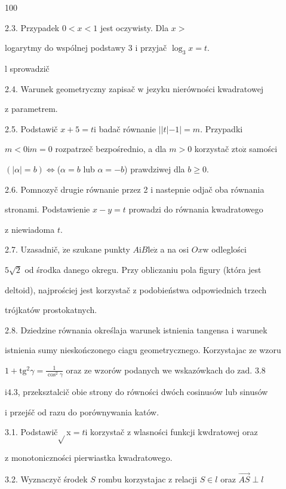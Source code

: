 \documentclass[a4paper,12pt]{article}
\begin{document}
100

2.3. Przypadek $0 < x < 1$ jest oczywisty. Dla $x >$

logarytmy do wspólnej podstawy 3 $\mathrm{i}$ przyjač $\log_{3}x=t.$

l sprowadzič

2.4. Warunek geometryczny zapisač $\mathrm{w}$ jezyku nierówności kwadratowej

$\mathrm{z}$ parametrem.

2.5. Podstawič $x+5 =t\mathrm{i}$ badač równanie $||t|-1| =m$. Przypadki

$m<0\mathrm{i}m=0$ rozpatrzeč bezpośrednio, a dla $m>0$ korzystač $\mathrm{z}\mathrm{t}\mathrm{o}\dot{\mathrm{z}}$ samości

$(|\alpha|=b)\Leftrightarrow$($\alpha=b$ lub $\alpha=-b$) prawdziwej dla $b\geq 0.$

2.6. Pomnozyč drugie równanie przez 2 $\mathrm{i}$ nastepnie odjač oba równania

stronami. Podstawienie $x-y = t$ prowadzi do równania kwadratowego

$\mathrm{z}$ niewiadoma $t.$

2.7. Uzasadnič, $\dot{\mathrm{z}}\mathrm{e}$ szukane punkty $A\mathrm{i}B\mathrm{l}\mathrm{e}\dot{\mathrm{z}}$ a na osi $Ox\mathrm{w}$ odleglości

$5\sqrt{2}$ od środka danego okregu. Przy obliczaniu pola figury (która jest

deltoid), najprościej jest korzystač $\mathrm{z}$ podobieństwa odpowiednich trzech

trójkatów prostokatnych.

2.8. Dziedzine równania określaja warunek istnienia tangensa $\mathrm{i}$ warunek

istnienia sumy nieskończonego ciagu geometrycznego. Korzystajac ze wzoru

$1+\mathrm{t}\mathrm{g}^{2}\gamma= \displaystyle \frac{1}{\cos^{2}\gamma}$ oraz ze wzorów podanych we wskazówkach do $\mathrm{z}\mathrm{a}\mathrm{d}$. 3.8

$\mathrm{i}4.3$, przeksztalcič obie strony do równości dwóch cosinusów lub sinusów

$\mathrm{i}$ przejśč od razu do porównywania katów.

3.1. Podstawič$\sqrt{}$x$=t\mathrm{i}$ korzystač $\mathrm{z}$ wlasności funkcji kwdratowej oraz

$\mathrm{z}$ monotoniczności pierwiastka kwadratowego.

3.2. Wyznaczyč środek $S$ rombu korzystajac $\mathrm{z}$ relacji $S\in l$ oraz $\vec{AS}\perp l$
\end{document}
